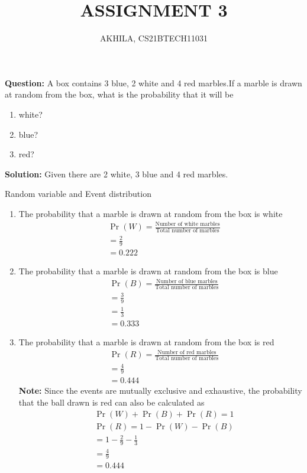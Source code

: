 \documentclass[journal,12pt,twocolumn]{IEEEtran}
\providecommand{\pr}[1]{\ensuremath{\Pr\left(#1\right)}}
\newcommand{\question}{\noindent \textbf{Question: }}
\newcommand{\solution}{\noindent \textbf{Solution: }}
\newcommand{\note}{\noindent \textbf{Note: }}
\begin{document}
\title{ASSIGNMENT 3}
\author{AKHILA, CS21BTECH11031}

\maketitle
\question
A box contains 3 blue, 2 white and 4 red marbles.If a marble is drawn at random from the box, what is the probability that it will be
    \begin{enumerate}[label=(\roman{enumi})]
		\item white?
		\item blue?
		\item red?
    \end{enumerate}
\solution
Given there are 2 white, 3 blue and 4 red marbles.\\ 
\begin{table}[H]

	\caption{Random variable and Event distribution}
	\label{tab1}
\end{table}
\begin{enumerate}[label=(\roman{enumi})]
      \item The probability that a marble is drawn
at random from the box is white
\begin{align}
	 &\pr{W} = \frac{\text{Number of white marbles}}{\text{Total number of marbles}}\\
	 &=\frac{2}{9}\\
	 &=0.222
\end{align}
      \item The probability that a marble is drawn
at random from the box is blue
\begin{align}
	 &\pr{B} = \frac{\text{Number of blue marbles}}{\text{Total number of marbles}}\\
	 &=\frac{3}{9}\\
	 &=\frac{1}{3}\\
	 &=0.333
\end{align}
      \item The probability that a marble is drawn
at random from the box is red
\begin{align}
	 &\pr{R} = \frac{\text{Number of red marbles}}{\text{Total number of marbles}}\\
	 &=\frac{4}{9}\\
	 &=0.444
\end{align}
\note  Since the events are mutually exclusive and exhaustive, the probability that the ball drawn is red can also be calculated as
\begin{align}
	&\pr{W}+\pr{B}+\pr{R}=1\\
    &\pr{R}=1-\pr{W}-\pr{B}\\
    &= 1-\frac{2}{9}-\frac{1}{3}\\
    &=\frac{4}{9}\\
    &=0.444
    \end{align}
\end{enumerate}
\end{document}
